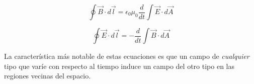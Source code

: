 \begin{equation}\label{29.22}
\oint\vec{B}\cdot d\vec{l}=\epsilon_0\mu_0\frac{d}{dt}\int	\vec{E}\cdot d\vec{A}
\end{equation}

\begin{equation}\label{29.23}
\oint\vec{E}\cdot d\vec{l}=-\frac{d}{dt}\int	\vec{B}\cdot d\vec{A}
\end{equation}

La característica más notable de estas ecuaciones es que un campo de \textit{cualquier} tipo que varíe con respecto al tiempo induce un campo del otro tipo en las regiones vecinas del espacio.





























%
